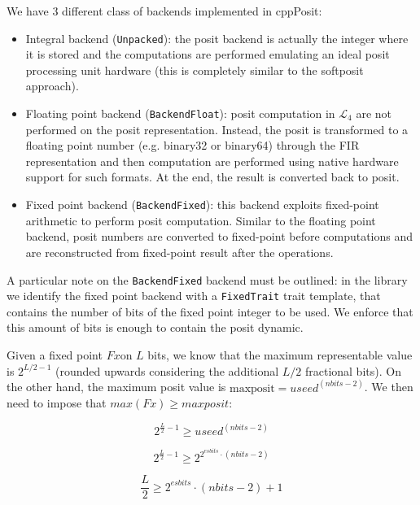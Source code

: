 We have 3 different class of backends implemented in cppPosit:
\begin{itemize}
    \item Integral backend (\texttt{Unpacked}): the posit backend is actually the integer where it is stored and the computations are performed emulating an ideal posit processing unit hardware (this is completely similar to the softposit approach).
    \item Floating point backend (\texttt{BackendFloat}): posit computation in $\mathcal{L}_4$ are not performed on the posit representation. Instead, the posit is transformed to a floating point number (e.g. binary32 or binary64) through the FIR representation and then computation are performed using native hardware support for such formats. At the end, the result is converted back to posit. 
    \item Fixed point backend (\texttt{BackendFixed}): this backend exploits fixed-point arithmetic to perform posit computation. Similar to the floating point backend, posit numbers are converted to fixed-point before computations and are reconstructed from fixed-point result after the operations.
\end{itemize}

A particular note on the \texttt{BackendFixed} backend must be outlined: in the library we identify the fixed point backend with a \texttt{FixedTrait} trait template, that contains the number of bits of the fixed point integer to be used. We enforce that this amount of bits is enough to contain the posit dynamic. 

Given a fixed point $Fx$on $L$ bits, we know that the maximum representable value is $2^{L/2 - 1}$ (rounded upwards considering the additional $L/2$ fractional bits). On the other hand, the maximum posit value is $\text{maxposit} = useed^{(nbits - 2)}$. We then need to impose that $max(Fx) \geq maxposit$: 

\begin{equation}
    2^{\frac{L}{2} - 1} \geq  useed^{(nbits - 2)}
\end{equation}

\begin{equation}
    2^{\frac{L}{2} - 1} \geq 2^{2^{esbits} \cdot (nbits - 2)}
\end{equation}

\begin{equation}
    \frac{L}{2} \geq 2^{esbits} \cdot (nbits - 2) + 1
\end{equation}


